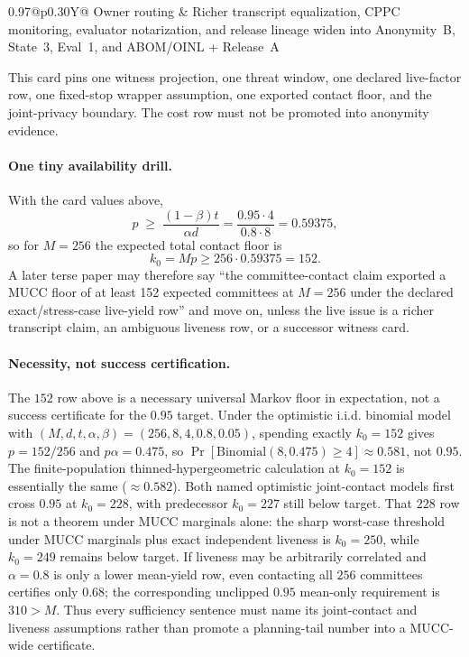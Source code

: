 \documentclass[11pt]{article}
\begin{document}
\begin{table}[t]
\begin{tabularx}{0.97\linewidth}{@{}p{0.30\linewidth}Y@{}}
Owner routing & Richer transcript equalization, CPPC monitoring, evaluator notarization, and release lineage widen into Anonymity~B, State~3, Eval~1, and ABOM/OINL + Release~A \\
\bottomrule
\end{tabularx}
\caption{A minimal public MUCC contact-cost card.  It supports the declared availability/contact-floor arithmetic and explicitly does not certify privacy of the joint contact-set witness.}
\label{tab:minimal-mucc-card}
\end{table}

This card pins one witness projection, one threat window, one declared live-factor row, one fixed-stop wrapper assumption, one exported contact floor, and the joint-privacy boundary.  The cost row must not be promoted into anonymity evidence.

\paragraph{One tiny availability drill.}
With the card values above,
\[
p \;\ge\; \frac{(1-\beta)t}{\alpha d}
 = \frac{0.95\cdot 4}{0.8\cdot 8}
 = 0.59375,
\]
so for $M=256$ the expected total contact floor is
\[
k_0 = Mp \ge 256\cdot 0.59375 = 152.
\]
A later terse paper may therefore say ``the committee-contact claim exported a MUCC floor of at least 152 expected committees at $M=256$ under the declared exact/stress-case live-yield row'' and move on, unless the live issue is a richer transcript claim, an ambiguous liveness row, or a successor witness card.

\paragraph{Necessity, not success certification.}
The $152$ row above is a necessary universal Markov floor in expectation, not a success certificate for the $0.95$ target.  Under the optimistic i.i.d. binomial model with $(M,d,t,\alpha,\beta)=(256,8,4,0.8,0.05)$, spending exactly $k_0=152$ gives $p=152/256$ and $p\alpha=0.475$, so $\Pr[\mathrm{Binomial}(8,0.475)\ge4]\approx0.581$, not $0.95$.  The finite-population thinned-hypergeometric calculation at $k_0=152$ is essentially the same ($\approx0.582$).  Both named optimistic joint-contact models first cross $0.95$ at $k_0=228$, with predecessor $k_0=227$ still below target.  That $228$ row is not a theorem under MUCC marginals alone: the sharp worst-case threshold under MUCC marginals plus exact independent liveness is $k_0=250$, while $k_0=249$ remains below target.  If liveness may be arbitrarily correlated and $\alpha=0.8$ is only a lower mean-yield row, even contacting all $256$ committees certifies only $0.68$; the corresponding unclipped $0.95$ mean-only requirement is $310>M$.  Thus every sufficiency sentence must name its joint-contact and liveness assumptions rather than promote a planning-tail number into a MUCC-wide certificate.
\end{document}
